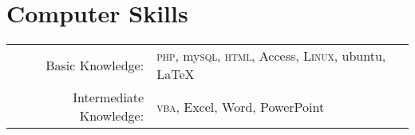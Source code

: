 \documentclass[a4paper,pt]{article}
\begin{document}
	\section{Computer Skills}
	\begin{tabular}{rl}
		Basic Knowledge:& \textsc{php}, my\textsc{sql}, \textsc{html}, Access, \textsc{Linux}, ubuntu, {\fb \LaTeX}\setmainfont[SmallCapsFont=Fontin-SmallCaps.otf]{Fontin.otf}\\
		Intermediate Knowledge:& \textsc{vba}, Excel, Word, PowerPoint\\
	\end{tabular}
	
	
	
	
\end{document}
